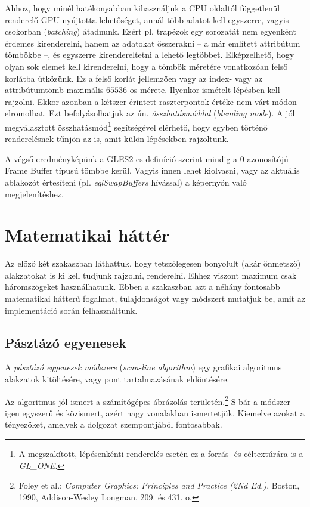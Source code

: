 \documentclass[12pt]{report}
\theoremstyle{definition}
\newcommand{\inenglish}[1]{\textsl{#1}}
\newcommand{\func}[1]{{\textsl{#1}}}
\begin{document}
Ahhoz, hogy minél hatékonyabban kihasználjuk a CPU oldaltól függetlenül
renderelő GPU nyújtotta lehetőséget, annál több adatot kell egyszerre, vagyis
csokorban (\inenglish{batching}) átadnunk. Ezért pl. trapézok egy sorozatát nem
egyenként érdemes kirenderelni, hanem az adatokat összerakni -- a már említett
attribútum tömbökbe --, és egyszerre kirendereltetni a lehető legtöbbet.
Elképzelhető, hogy olyan sok elemet kell kirenderelni, hogy a tömbök méretére
vonatkozóan felső korlátba ütközünk. Ez a felső korlát jellemzően vagy az
index- vagy az attribútumtömb maximális $65536$-os mérete. Ilyenkor ismételt
lépésben kell rajzolni. Ekkor azonban a kétszer érintett raszterpontok értéke
nem várt módon elromolhat. Ezt befolyásolhatjuk az ún. \emph{összhatásmóddal}
(\inenglish{blending mode}). A jól megválasztott összhatásmód\footnote{A
megszakított, lépésenkénti renderelés esetén ez a forrás- és céltextúrára is a
\func{GL\_ONE}.} segítségével elérhető, hogy egyben történő renderelésnek
tűnjön az is, amit külön lépésekben rajzoltunk.

A végső eredményképünk a GLES2-es definíció szerint mindig a $0$ azonosítójú
Frame Buffer típusú tömbbe kerül. Vagyis innen lehet kiolvasni, vagy az
aktuális ablakozót értesíteni (pl. \emph{eglSwapBuffers} hívással) a képernyőn
való megjelenítéshez.

    \section[Matematikai háttér]{Matematikai háttér}
    \label{sec:Matematikai_háttér}

Az előző két szakaszban láthattuk, hogy tetszőlegesen bonyolult (akár önmetsző)
alakzatokat is ki kell tudjunk rajzolni, renderelni. Ehhez viszont maximum csak
háromszögeket használhatunk. Ebben a szakaszban azt a néhány fontosabb
matematikai hátterű fogalmat, tulajdonságot vagy módszert mutatjuk be, amit az
implementáció során felhasználtunk.

    \subsection*{Pásztázó egyenesek}
    \label{sec:Pasztazo_egyenesek}

A \emph{pásztázó egyenesek módszere} (\inenglish{scan-line algorithm}) egy
grafikai algoritmus alakzatok kitöltésére, vagy pont tartalmazásának
eldöntésére.

Az algoritmus jól ismert a számítógépes ábrázolás területén.\footnote{Foley et
al.: \emph{Computer Graphics: Principles and Practice (2Nd Ed.)}, Boston, 1990,
Addison-Wesley Longman, 209. és 431. o.} S bár a módszer igen egyszerű és
közismert, azért nagy vonalakban ismertetjük. Kiemelve azokat a tényezőket,
amelyek a dolgozat szempontjából fontosabbak.
\end{document}
